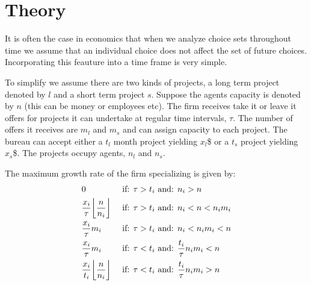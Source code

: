 \documentclass[12pt]{report}
\numberwithin{equation}{section}
\DeclarePairedDelimiter\floor{\lfloor}{\rfloor}
\begin{document}
\section{Theory}

It is often the case in economics that when we analyze choice sets throughout time we assume that an individual choice does not affect the set of future choices. Incorporating this feauture into a time frame is very simple. 

\newpage

To simplify we assume there are two kinds of projects, a long term project denoted by $l$ and a short term project $s$. Suppose the agents capacity is denoted by $n$ (this can be money or employees etc). The firm receives take it or leave it offers for projects it can undertake at regular time intervals, $\tau$. The number of offers it receives are $m_l$ and $m_s$ and can assign capacity to each project. The bureau can accept either a $t_l$ month project yielding $x_l$\$ or a $t_s$ project yielding $x_s$\$. The projects occupy agents, $n_l$ and $n_s$. 



The maximum growth rate of the firm specializing is given by:
\begin{align*}
& 0 && \text{ if: } \tau > t_i \text{  and: } n_i>n \\
& \frac{x_i}{\tau} \floor*{\frac{n}{n_i}} && \text{ if: } \tau > t_i \text{  and: } n_i<n<n_i m_i \\
&\frac{x_i}{\tau} m_i && \text{ if: } \tau > t_i \text{  and: } n_i<n_im_i<n \\
&\frac{x_i }{\tau} m_i && \text{ if: } \tau < t_i \text{  and: } \frac{t_i}{\tau} n_i m_i<n \\
&\frac{x_i }{t_i} \floor*{\frac{n}{n_i}} && \text{ if: } \tau < t_i \text{  and: } \frac{t_i}{\tau} n_i m_i>n
\end{align*}
\end{document}
